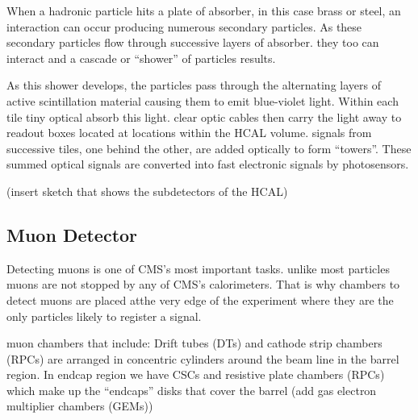When a hadronic particle hits a plate of absorber, in this case brass or steel, an interaction can occur producing numerous secondary particles. As these secondary particles flow through successive layers of absorber. they too can interact and a cascade or “shower” of particles results. 

As this shower develops, the particles pass through the alternating layers of active scintillation material causing them to emit blue-violet light. Within each tile tiny optical absorb this light. clear optic cables then carry the light away to readout boxes located at locations within the HCAL volume. signals from successive tiles, one behind the other, are added optically to form “towers”. These summed optical signals are converted into fast electronic signals by photosensors.  

(insert sketch that shows the subdetectors of the HCAL)  









\subsection{Muon Detector}
Detecting muons is one of CMS’s most important tasks. unlike most particles muons are not stopped by any of CMS’s calorimeters. That is why chambers to detect muons are placed atthe very edge of the experiment where they are the only particles likely to register a signal. 

muon chambers that include: Drift tubes (DTs) and cathode strip chambers (RPCs) are arranged in concentric cylinders around the beam line in the barrel region. In endcap region we have CSCs and resistive plate chambers (RPCs) which make up the “endcaps” disks that cover the barrel (add gas electron multiplier chambers (GEMs))  

